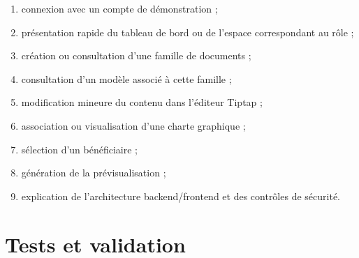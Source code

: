\begin{enumerate}
    \item connexion avec un compte de démonstration ;
    \item présentation rapide du tableau de bord ou de l'espace correspondant au rôle ;
    \item création ou consultation d'une famille de documents ;
    \item consultation d'un modèle associé à cette famille ;
    \item modification mineure du contenu dans l'éditeur Tiptap ;
    \item association ou visualisation d'une charte graphique ;
    \item sélection d'un bénéficiaire ;
    \item génération de la prévisualisation ;
    \item explication de l'architecture backend/frontend et des contrôles de sécurité.
\end{enumerate}


\section{Tests et validation}

